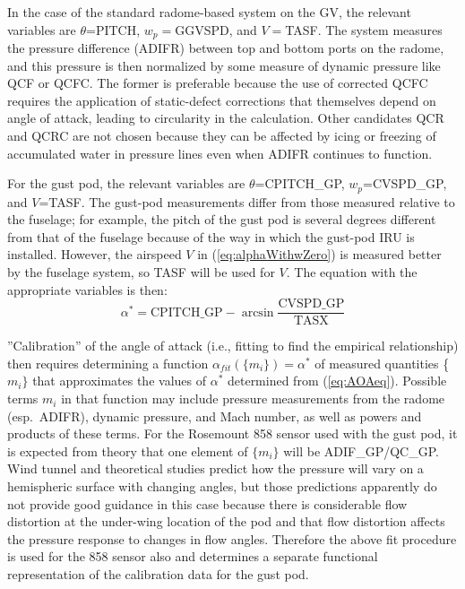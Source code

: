 \documentclass[12pt,twoside,english]{article}\usepackage[]{graphicx}\usepackage[]{color}
\begin{document}
In the case of the standard radome-based system on the GV, the relevant variables are $\theta$=PITCH, $w_{p}=$GGVSPD, and $V=$TASF. The system measures the pressure difference (ADIFR) between top and bottom ports on the radome, and this pressure is then normalized by some measure of dynamic pressure like QCF or QCFC. The former is preferable because the use of corrected QCFC requires the application of static-defect corrections that themselves depend on angle of attack, leading to circularity in the calculation. Other candidates QCR and QCRC are not chosen because they can be affected by icing or freezing of accumulated water in pressure lines even when ADIFR continues to function. 

For the gust pod, the relevant variables are $\theta$=CPITCH\_GP, $w_{p}$=CVSPD\_GP, and $V$=TASF. The gust-pod measurements differ from those measured relative to the fuselage; for example, the pitch of the gust pod is several degrees different from that of the fuselage because of the way in which the gust-pod IRU is installed. However, the airspeed $V$ in (\ref{eq:alphaWithwZero}) is measured better by the fuselage system, so TASF will be used for $V$. The equation with the appropriate variables is then:  
\begin{equation}
\alpha^{*}=\mathrm{CPITCH\_GP}-\arcsin\frac{\mathrm{CVSPD\_GP}}{\mathrm{TASX}}\label{eq:AOAeq} 
\end{equation}


''Calibration'' of the angle of attack (i.e., fitting to find the empirical relationship) then requires determining a function $\alpha_{fit}(\{m_{i}\})=\alpha^{*}$ of measured quantities \{$m_{i}\}$ that approximates the values of $\alpha^{*}$ determined from (\ref{eq:AOAeq}). Possible terms $m_{i}$ in that function may include pressure measurements from the radome (esp.~ADIFR), dynamic pressure, and Mach number, as well as powers and products of these terms. For the Rosemount 858 sensor used with the gust pod, it is expected from theory that one element of $\{m_{i}\}$ will be ADIF\_GP/QC\_GP\@. Wind tunnel and theoretical studies predict how the pressure will vary on a hemispheric surface with changing angles, but those predictions apparently do not provide good guidance in this case because there is considerable flow distortion at the under-wing location of the pod and that flow distortion affects the pressure response to changes in flow angles. Therefore the above fit procedure is used for the 858 sensor also and determines a separate functional representation of the calibration data for the gust pod. 
\end{document}
